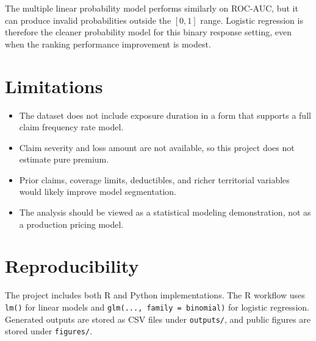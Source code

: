 \documentclass[11pt,letterpaper]{article}
\begin{document}
The multiple linear probability model performs similarly on ROC-AUC, but it can produce invalid probabilities outside the \([0,1]\) range. Logistic regression is therefore the cleaner probability model for this binary response setting, even when the ranking performance improvement is modest.

\section{Limitations}

\begin{itemize}
  \item The dataset does not include exposure duration in a form that supports a full claim frequency rate model.
  \item Claim severity and loss amount are not available, so this project does not estimate pure premium.
  \item Prior claims, coverage limits, deductibles, and richer territorial variables would likely improve model segmentation.
  \item The analysis should be viewed as a statistical modeling demonstration, not as a production pricing model.
\end{itemize}

\section{Reproducibility}

The project includes both R and Python implementations. The R workflow uses \texttt{lm()} for linear models and \texttt{glm(..., family = binomial)} for logistic regression. Generated outputs are stored as CSV files under \texttt{outputs/}, and public figures are stored under \texttt{figures/}.
\end{document}

